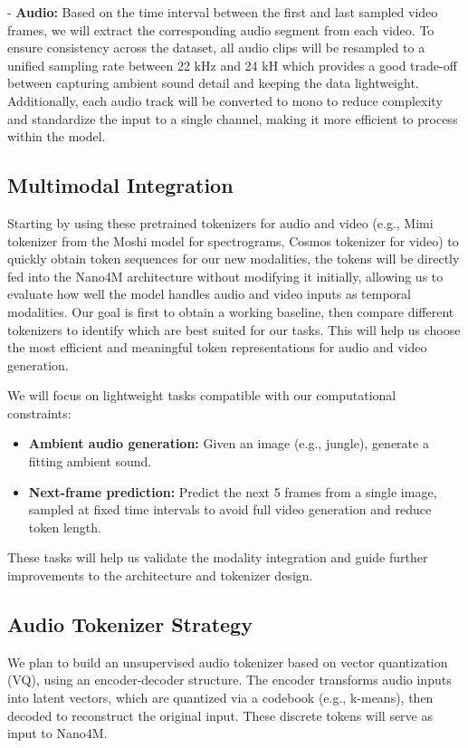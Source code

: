 \documentclass[10pt,conference,compsocconf]{IEEEtran}
\begin{document}
- \textbf{Audio:} Based on the time interval between the first and last sampled video frames, we will extract the corresponding audio segment from each video. To ensure consistency across the dataset, all audio clips will be resampled to a unified sampling rate between 22 kHz and 24 kH which provides a good trade-off between capturing ambient sound detail and keeping the data lightweight. Additionally, each audio track will be converted to mono to reduce complexity and standardize the input to a single channel, making it more efficient to process within the model.

\subsection{Multimodal Integration}
Starting by using these pretrained tokenizers for audio and video (e.g., Mimi tokenizer from the Moshi model \cite{defossez_moshi_2024} for spectrograms, Cosmos tokenizer \cite{nvidia_cosmos_2025} for video) to quickly obtain token sequences for our new modalities, the tokens will be directly fed into the Nano4M architecture without modifying it initially, allowing us to evaluate how well the model handles audio and video inputs as temporal modalities.
% 
Our goal is first to obtain a working baseline, then compare different tokenizers to identify which are best suited for our tasks. This will help us choose the most efficient and meaningful token representations for audio and video generation.

We will focus on lightweight tasks compatible with our computational constraints:
\begin{itemize}
    \item \textbf{Ambient audio generation:} Given an image (e.g., jungle), generate a fitting ambient sound.
    \item \textbf{Next-frame prediction:} Predict the next 5 frames from a single image, sampled at fixed time intervals to avoid full video generation and reduce token length.
\end{itemize}

These tasks will help us validate the modality integration and guide further improvements to the architecture and tokenizer design.


\subsection{Audio Tokenizer Strategy}

We plan to build an unsupervised audio tokenizer based on vector quantization (VQ), using an encoder-decoder structure. The encoder transforms audio inputs into latent vectors, which are quantized via a codebook (e.g., k-means), then decoded to reconstruct the original input. These discrete tokens will serve as input to Nano4M.
\end{document}
